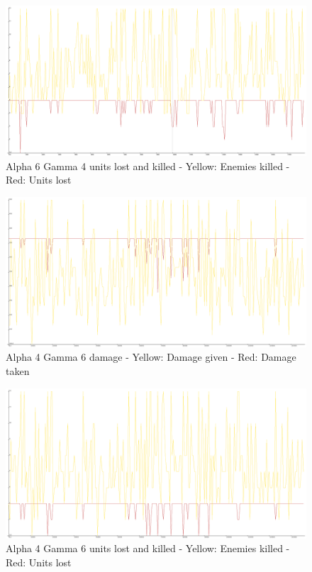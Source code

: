 \begin{figure}
\includegraphics[angle=-90, scale=0.25]{Figures/learningrate/A6G4/units_lost_and_killed.png}
\caption{Alpha 6 Gamma 4 units lost and killed - Yellow: Enemies killed - Red: Units lost}
\label{fig:a6g4_units lost and killed}
\end{figure}	



\begin{figure}
\includegraphics[angle=-90, scale=0.25]{Figures/learningrate/A4G6/damage.png}
\caption{Alpha 4 Gamma 6 damage - Yellow: Damage given - Red: Damage taken}
\label{fig:a4g6_damage}
\end{figure}	

\begin{figure}
\includegraphics[angle=-90, scale=0.25]{Figures/learningrate/A4G6/units_lost_and_units_killed.png}
\caption{Alpha 4 Gamma 6 units lost and killed - Yellow: Enemies killed - Red: Units lost}
\label{fig:a6g4_units lost and killed}
\end{figure}	


